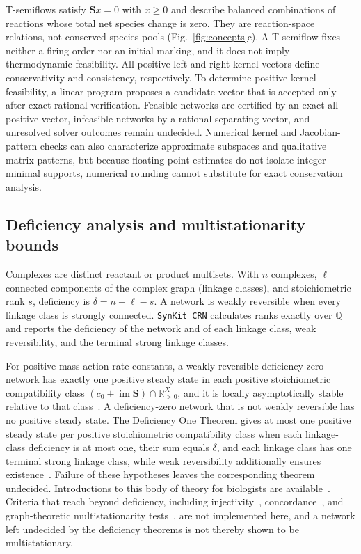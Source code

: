 \documentclass[10pt,a4paper,fleqn]{article}
\newcommand{\synkitcrn}{\texttt{SynKit CRN}\xspace}
\begin{document}
T-semiflows satisfy $\mathbf Sx=0$ with $x\ge0$ and describe balanced combinations of reactions whose total net species change is zero. They are reaction-space relations, not conserved species pools (Fig.~\ref{fig:concepts}c). A T-semiflow fixes neither a firing order nor an initial marking, and it does not imply thermodynamic feasibility. All-positive left and right kernel vectors define conservativity and consistency, respectively. To determine positive-kernel feasibility, a linear program proposes a candidate vector that is accepted only after exact rational verification. Feasible networks are certified by an exact all-positive vector, infeasible networks by a rational separating vector, and unresolved solver outcomes remain undecided. Numerical kernel and Jacobian-pattern checks can also characterize approximate subspaces and qualitative matrix patterns, but because floating-point estimates do not isolate integer minimal supports, numerical rounding cannot substitute for exact conservation analysis.

\subsection{Deficiency analysis and multistationarity bounds}
\label{sec:crnt}

Complexes are distinct reactant or product multisets. With $n$ complexes, $\ell$ connected components of the complex graph (linkage classes), and stoichiometric rank $s$, deficiency is $\delta=n-\ell-s$.
A network is weakly reversible when every linkage class is strongly connected. \synkitcrn calculates ranks exactly over $\mathbb Q$ and reports the deficiency of the network and of each linkage class, weak reversibility, and the terminal strong linkage classes.

For positive mass-action rate constants, a weakly reversible deficiency-zero network has exactly one positive steady state in each positive stoichiometric compatibility class $(c_0+\operatorname{im}\mathbf S)\cap\mathbb R^{X}_{>0}$, and it is locally asymptotically stable relative to that class~\cite{horn1972general,feinberg1987deficiency}. A deficiency-zero network that is not weakly reversible has no positive steady state. The Deficiency One Theorem gives at most one positive steady state per positive stoichiometric compatibility class when each linkage-class deficiency is at most one, their sum equals $\delta$, and each linkage class has one terminal strong linkage class, while weak reversibility additionally ensures existence~\cite{feinberg1995existence}. Failure of these hypotheses leaves the corresponding theorem undecided. Introductions to this body of theory for biologists are available~\cite{gunawardena2003crnt}. Criteria that reach beyond deficiency, including injectivity~\cite{craciun2005injectivity}, concordance~\cite{shinar2012concordant}, and graph-theoretic multistationarity tests~\cite{mincheva2007graph1}, are not implemented here, and a network left undecided by the deficiency theorems is not thereby shown to be multistationary.
\end{document}
